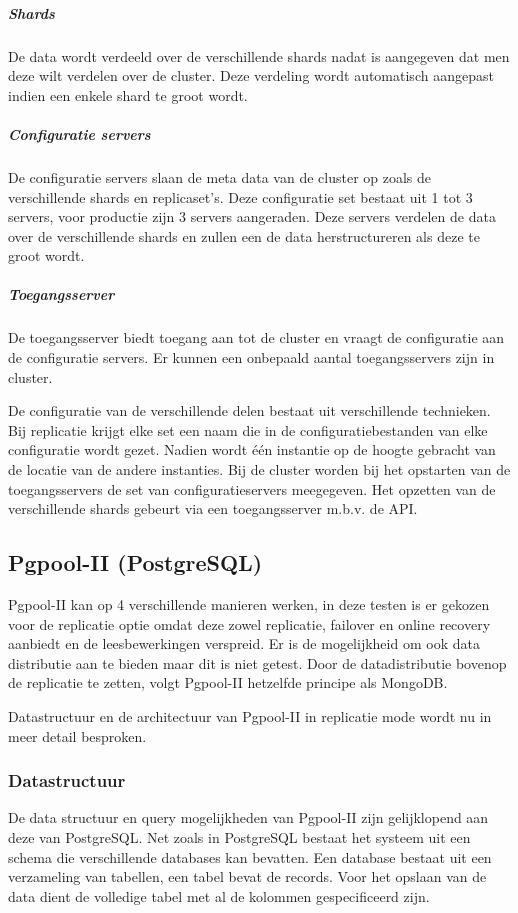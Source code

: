 \subparagraph{Shards} De data wordt verdeeld over de verschillende shards nadat is aangegeven dat men deze wilt verdelen over de cluster. Deze verdeling wordt automatisch aangepast indien een enkele shard te groot wordt. 
\subparagraph{Configuratie servers} De configuratie servers slaan de meta data van de cluster op zoals de verschillende shards en replicaset's. Deze configuratie set bestaat uit 1 tot 3 servers, voor productie zijn 3 servers aangeraden. Deze servers verdelen de data over de verschillende shards en zullen een de data herstructureren als deze te groot wordt. 
\subparagraph{Toegangsserver} De toegangsserver biedt toegang aan tot de cluster en vraagt de configuratie aan de configuratie servers. Er kunnen een onbepaald aantal toegangsservers zijn in cluster. 

De configuratie van de verschillende delen bestaat uit verschillende technieken. Bij replicatie krijgt elke set een naam die in de configuratiebestanden van elke configuratie wordt gezet. Nadien wordt één instantie op de hoogte gebracht van de locatie van de andere instanties. Bij de cluster worden bij het opstarten van de toegangsservers de set van configuratieservers meegegeven. Het opzetten van de verschillende shards gebeurt via een toegangsserver m.b.v. de API. 

\subsection{Pgpool-II (PostgreSQL)\cite{pgpool-doc}}
Pgpool-II kan op 4 verschillende manieren werken, in deze testen is er gekozen voor de replicatie optie omdat deze zowel replicatie, failover en online recovery aanbiedt en de leesbewerkingen verspreid. Er is de mogelijkheid om ook data distributie aan te bieden maar dit is niet getest. Door de datadistributie bovenop de replicatie te zetten, volgt Pgpool-II hetzelfde principe als MongoDB. 

Datastructuur en de architectuur van Pgpool-II in replicatie mode wordt nu in meer detail besproken. 

\subsubsection{Datastructuur}
De data structuur en query mogelijkheden van Pgpool-II zijn gelijklopend aan deze van PostgreSQL. Net zoals in PostgreSQL bestaat het systeem uit een schema die verschillende databases kan bevatten. Een database bestaat uit een verzameling van tabellen, een tabel bevat de records. Voor het opslaan van de data dient de volledige tabel met al de kolommen gespecificeerd zijn. 

